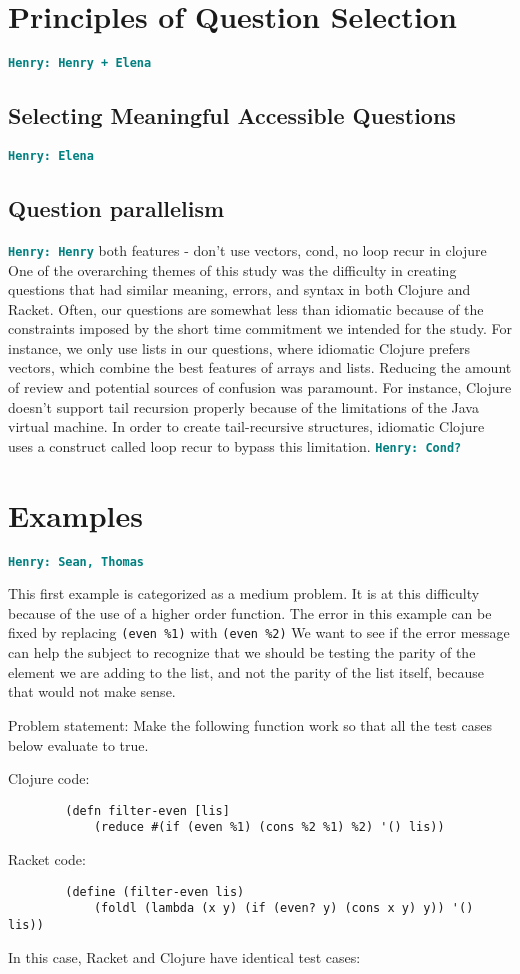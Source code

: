 \documentclass[12pt]{article}
\newcommand{\comment}[1]{{\bf \tt  {#1}}}
\newcommand{\hfcomment}[1]{\textcolor{Teal}{\comment{Henry: {#1}}}}
\begin{document}
\section{Principles of Question Selection}\label{sec:select}
	\hfcomment{Henry + Elena}
	\subsection{Selecting Meaningful Accessible Questions}\label{sec:meaning}
	\hfcomment{Elena}
	\subsection{Question parallelism}\label{sec:parallel}
	\hfcomment{Henry}
	both features - don't use vectors, cond, no loop recur in clojure
	One of the overarching themes of this study was the difficulty in creating questions that had similar meaning, errors, and syntax in both Clojure and Racket.
	 Often, our questions are somewhat less than idiomatic because of the constraints imposed by the short time commitment we intended for the study.
	  For instance, we only use lists in our questions, where idiomatic Clojure prefers vectors, which combine the best features of arrays and lists.
	   Reducing the amount of review and potential sources of confusion was paramount. 
	   For instance, Clojure doesn't support tail recursion properly because of the limitations of the Java virtual machine.
	    In order to create tail-recursive structures, idiomatic Clojure uses a construct called loop recur to bypass this limitation. \hfcomment{Cond?}
\section{Examples}\label{sec:examples}
	\hfcomment{Sean, Thomas}
	
	This first example is categorized as a medium problem. 
	It is at this difficulty because of the use of a higher order function.
	The error in this example can be fixed by replacing \texttt{(even \%1)} with \texttt{(even \%2)} 
	We want to see if the error message can help the subject to recognize that we should be testing the parity of the element we are adding to the list, and not the parity of the list itself, because that would not make sense. 
	
	Problem statement:
		Make the following function work so that all the test cases below evaluate to true.
	
	Clojure code:
\begin{verbatim}
		(defn filter-even [lis] 
			(reduce #(if (even %1) (cons %2 %1) %2) '() lis))
\end{verbatim}
	Racket code:
\begin{verbatim}
		(define (filter-even lis) 
			(foldl (lambda (x y) (if (even? y) (cons x y) y)) '() lis))
\end{verbatim}
	In this case, Racket and Clojure have identical test cases: 
\end{document}
